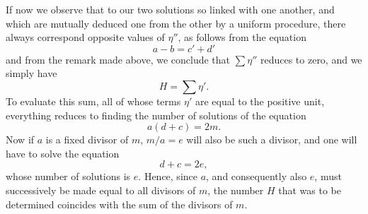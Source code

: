 \documentclass[11pt]{article}
\begin{document}
If now we observe that to our two solutions so linked with one another, and which are mutually deduced one from the other by a uniform procedure, there always correspond opposite values of \(\eta''\), as follows from the equation
\[
a-b=c'+d'
\]
and from the remark made above, we conclude that \(\sum\eta''\) reduces to zero, and we simply have
\[
H=\sum\eta'.
\]
To evaluate this sum, all of whose terms \(\eta'\) are equal to the positive unit, everything reduces to finding the number of solutions of the equation
\[
a(d+c)=2m.
\]
Now if \(a\) is a fixed divisor of \(m\), \(m/a=e\) will also be such a divisor, and one will have to solve the equation
\[
d+c=2e,
\]
whose number of solutions is \(e\). Hence, since \(a\), and consequently also \(e\), must successively be made equal to all divisors of \(m\), the number \(H\) that was to be determined coincides with the sum of the divisors of \(m\).
\end{document}
